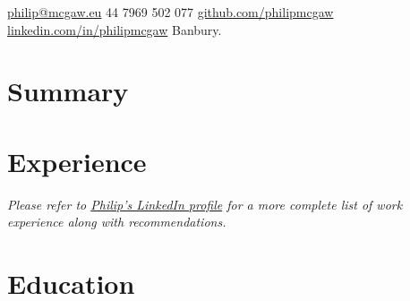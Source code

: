 \documentclass[10pt,a4paper]{article}
\begin{document}
\sloppy  %


 {}{} %

\nobreakvspace{0.3em}  %


\noindent\href{mailto:philip@mcgaw.eu}{philip@mcgaw.eu}\sbull
\textsmaller{+}44 7969 502 077\sbull
\href{https://github.com/philipmcgaw}{github.com/philipmcgaw}\sbull
\href{http://linkedin.com/in/philipmcgaw}{linkedin.com/in/philipmcgaw}\sbull
Banbury.

\spacedhrule{0.9em}{-0.4em}  %

\section*{Summary}
\vspace{-1.3em}  %


\spacedhrule{0em}{-0.4em}

\section*{Experience}







\vspace{-0.2em}
\begin{center}
  \emph{\small Please refer to \href{http://www.linkedin.com/in/philipmcgaw}{Philip's LinkedIn profile} for a more complete list of work experience along with recommendations.}
\end{center}

\spacedhrule{-0.2em}{-0.4em}

\section*{Education}

\end{document}
